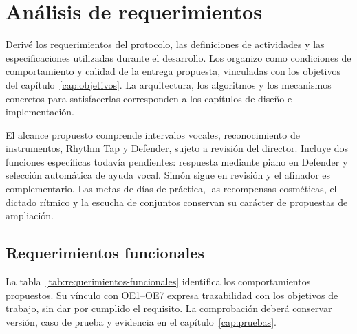 \chapter{Análisis de requerimientos}
\label{cap:requerimientos}
Derivé los requerimientos del protocolo, las definiciones de actividades y las
especificaciones utilizadas durante el desarrollo. Los organizo como condiciones
de comportamiento y calidad de la entrega propuesta, vinculadas con los objetivos
del capítulo~\ref{cap:objetivos}. La arquitectura, los algoritmos y los mecanismos
concretos para satisfacerlas corresponden a los capítulos de diseño e implementación.

El alcance propuesto comprende intervalos vocales, reconocimiento de instrumentos,
Rhythm Tap y Defender, sujeto a revisión del director. Incluye dos funciones
específicas todavía pendientes: respuesta mediante piano en Defender y selección
automática de ayuda vocal. Simón sigue en revisión y el afinador es complementario.
Las metas de días de práctica, las recompensas cosméticas, el dictado rítmico y la escucha
de conjuntos conservan su carácter de propuestas de ampliación.

\section{Requerimientos funcionales}
La tabla~\ref{tab:requerimientos-funcionales} identifica los comportamientos
propuestos. Su vínculo con OE1--OE7 expresa trazabilidad con los objetivos de
trabajo, sin dar por cumplido el requisito. La comprobación deberá conservar
versión, caso de prueba y evidencia en el capítulo~\ref{cap:pruebas}.


